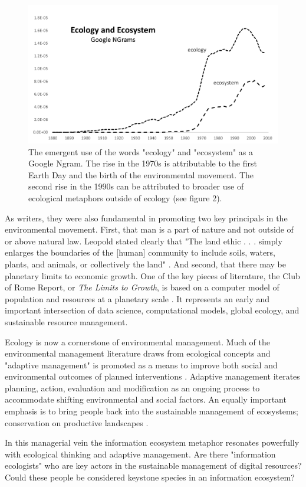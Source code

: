 \begin{figure}[!ht]
  \centering
    \includegraphics[width=5.5in]{figures/ecologyEcosystem}
  \caption{The emergent use of the words "ecology" and "ecosystem" as a Google Ngram. The rise in the 1970s is attributable to the first Earth Day and the birth of the environmental movement. The second rise in the 1990s can be attributed to broader use of ecological metaphors outside of ecology (see figure 2).}
\end{figure}
 
As writers, they were also fundamental in promoting two key principals in the environmental movement. First, that man is a part of nature and not outside of or above natural law. Leopold stated clearly that "The land ethic . . . simply enlarges the boundaries of the [human] community to include soils, waters, plants, and animals, or collectively the land" \citep[][p. 204]{leopold_1949}. And second, that there may be planetary limits to economic growth. One of the key pieces of literature, the Club of Rome Report, or \textit{The Limits to Growth}, is based on a computer model of population and resources at a planetary scale \citep{meadows_1972}. It represents an early and important intersection of data science, computational models, global ecology, and sustainable resource management.
 
Ecology is now a cornerstone of environmental management. Much of the environmental management literature draws from ecological concepts and "adaptive management" is promoted as a means to improve both social and environmental outcomes of planned interventions \citep{holling_1978,leopold_1963}. Adaptive management iterates planning, action, evaluation and modification as an ongoing process to accommodate shifting environmental and social factors. An equally important emphasis is to bring people back into the sustainable management of ecosystems; conservation on productive landscapes \citep{berkes_2000,holling_2002}. 

In this managerial vein the information ecosystem metaphor resonates powerfully with ecological thinking and adaptive management. Are there "information ecologists" who are key actors in the sustainable management of digital resources? Could these people be considered keystone species in an information ecosystem?